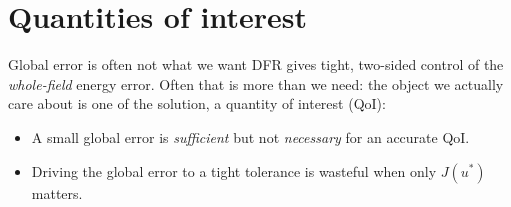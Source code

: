 \documentclass[11pt,aspectratio=169]{beamer}
\begin{document}
\section{Quantities of interest}

\begin{frame}{Global error is often not what we want}
  DFR gives tight, two-sided control of the \emph{whole-field} energy error. Often
  that is more than we need: the object we actually care about is one
   of the solution, a quantity of interest (QoI):
  \medskip
  \begin{center}
  \end{center}
  \medskip
  \begin{itemize}\itemsep0.5em
    \item A small global error is \emph{sufficient} but not \emph{necessary} for
          an accurate QoI.
    \item Driving the global error to a tight tolerance is wasteful when only
          $J(u^*)$ matters.
  \end{itemize}
\end{frame}
\end{document}
